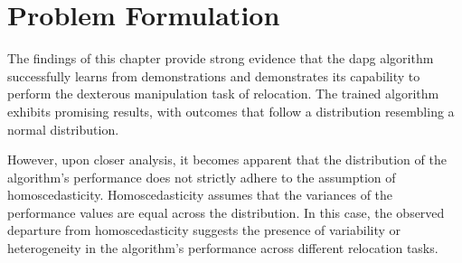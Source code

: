 


\section{Problem Formulation}\label{sec:2-pose-estimation-problem}
The findings of this chapter provide strong evidence that the \gls{dapg} algorithm successfully learns from demonstrations and demonstrates its capability to perform the dexterous manipulation task of relocation. The trained algorithm exhibits promising results, with outcomes that follow a distribution resembling a normal distribution.\medskip

However, upon closer analysis, it becomes apparent that the distribution of the algorithm's performance does not strictly adhere to the assumption of homoscedasticity. Homoscedasticity assumes that the variances of the performance values are equal across the distribution. In this case, the observed departure from homoscedasticity suggests the presence of variability or heterogeneity in the algorithm's performance across different relocation tasks. \medskip

